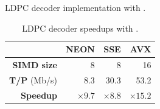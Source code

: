 
\begin{listing}
  \inputminted[frame=lines,linenos]{C++}{main/chapter3/src/ldpc/bp_min_sum_simd.cpp}
  \caption{LDPC decoder implementation with \MIPP.}
  \label{lst:vec_ldpc_bp_min_sum_simd}
\end{listing}

\begin{table}
  \centering
  \caption{LDPC decoder speedups with \MIPP.}
  \label{tab:vec_ldpc_speedup}
  \begin{tabular}{r| r r r}
                      & \textbf{NEON} & \textbf{SSE} & \textbf{AVX}  \\ \hline \hline
  \textbf{SIMD size}  & 8             & 8            & 16            \\ %
  \textbf{T/P} (Mb/s) & 8.3           & 30.3         & 53.2          \\ %
  \textbf{Speedup}    & $\times 9.7$  & $\times 8.8$ & $\times 15.2$ \\
  \end{tabular}
\end{table}

